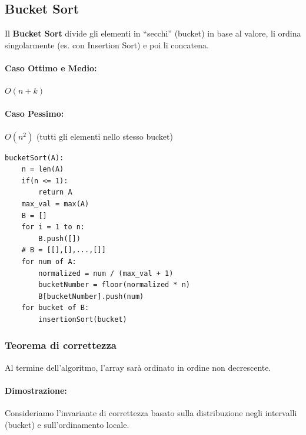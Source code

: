 \documentclass[a4paper,12pt]{article}
\begin{document}
\subsection{Bucket Sort}
Il \textbf{Bucket Sort} divide gli elementi in “secchi” (bucket) in base al valore, li ordina singolarmente (es. con Insertion Sort) e poi li concatena.

\paragraph{Caso Ottimo e Medio:} $O(n + k)$\\
\paragraph{Caso Pessimo:} $O(n^2)$ (tutti gli elementi nello stesso bucket)

\begin{lstlisting}
bucketSort(A):  
    n = len(A)
    if(n <= 1):
        return A
    max_val = max(A)
    B = []
    for i = 1 to n:
        B.push([])
    # B = [[],[],...,[]]
    for num of A:
        normalized = num / (max_val + 1)
        bucketNumber = floor(normalized * n)
        B[bucketNumber].push(num)
    for bucket of B:
        insertionSort(bucket) 
\end{lstlisting}
\subsubsection{Teorema di correttezza}
Al termine dell'algoritmo, l'array sarà ordinato in ordine non decrescente.

\paragraph{Dimostrazione:}
Consideriamo l'invariante di correttezza basato sulla distribuzione negli intervalli (bucket) e sull'ordinamento locale.
\end{document}
